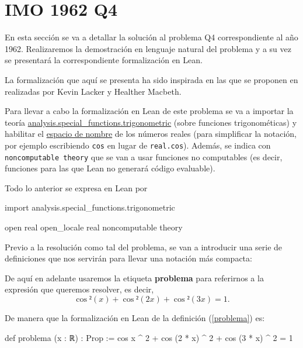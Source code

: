 \section{IMO 1962 Q4}

En esta sección se va a detallar la solución al problema Q4
correspondiente al año 1962. Realizaremos la demostración en lenguaje
natural del problema y a su vez se presentará la correspondiente
formalización en Lean.

La formalización que aquí se presenta ha sido inspirada en
las que se proponen en \cite{KLHM} realizadas por Kevin Lacker y
Healther Macbeth.

\noindent
{}

Para llevar a cabo la formalización en Lean de este problema se va a
importar la teoría
\href{https://github.com/leanprover-community/mathlib/blob/master/src/analysis/special_functions/trigonometric.lean}{analysis.special\_functions.trigonometric}
(sobre funciones trigonométicas) y habilitar el
\href{https://leanprover.github.io/reference/other_commands.html#namespaces}{espacio
  de nombre} de los números reales (para simplificar la notación, por
ejemplo escribiendo \texttt{cos} en lugar de \texttt{real.cos}). Además,
se indica con \texttt{noncomputable theory} que se van a usar funciones
no computables (es decir, funciones para las que Lean no generará código
evaluable).

Todo lo anterior se expresa en Lean por
\begin{leancode}
import analysis.special_functions.trigonometric

open real
open_locale real
noncomputable theory
\end{leancode}

Previo a la resolución como tal del problema, se van a introducir
una serie de definiciones que nos servirán para llevar una notación
más compacta:

\begin{definicion}\label{problema}
  De aquí en adelante usaremos la etiqueta \textbf{problema}
  para referirnos a la expresión que queremos resolver,
  es decir,
  \begin{equation}\label{expresionprob}
    \cos²(x)+\cos²(2x)+\cos²(3x)=1.
  \end{equation}
\end{definicion}

De manera que la formalización en Lean de la definición
(\ref{problema}) es:
\begin{leancode}
def problema (x : ℝ) : Prop :=
cos x ^ 2 + cos (2 * x) ^ 2 + cos (3 * x) ^ 2 = 1
\end{leancode}

